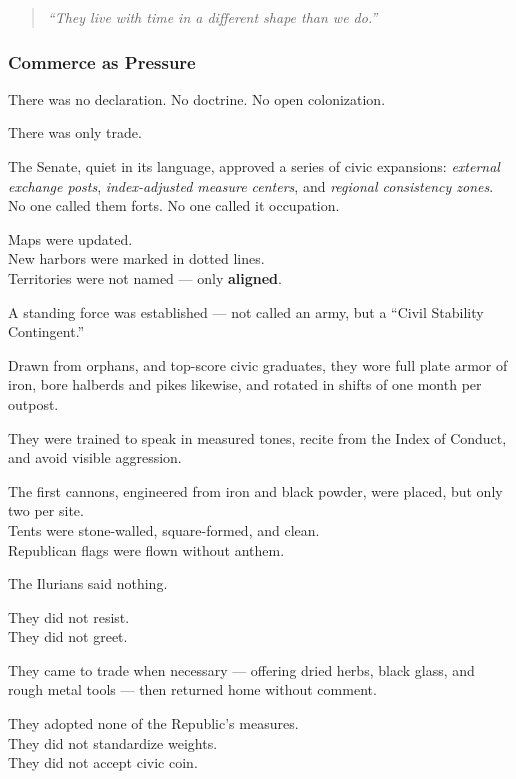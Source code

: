 \documentclass[12pt]{article}
\begin{document}
\begin{quote}
\textit{“They live with time in a different shape than we do.”}
\end{quote}

\dotfill

\subsubsection{Commerce as Pressure}

There was no declaration. No doctrine. No open colonization.

There was only trade.

The Senate, quiet in its language, approved a series of civic expansions: \textit{external exchange posts}, \textit{index-adjusted measure centers}, and \textit{regional consistency zones}. No one called them forts. No one called it occupation.

Maps were updated.\\
New harbors were marked in dotted lines.\\
Territories were not named — only \textbf{aligned}.

\vspace{1em}

A standing force was established — not called an army, but a ``Civil Stability Contingent.”

Drawn from orphans, and top-score civic graduates, they wore full plate armor of iron, bore halberds and pikes likewise, and rotated in shifts of one month per outpost.

They were trained to speak in measured tones, recite from the Index of Conduct, and avoid visible aggression.

The first cannons, engineered from iron and black powder, were placed, but only two per site.\\
Tents were stone-walled, square-formed, and clean.\\
Republican flags were flown without anthem.

\vspace{1em}

The Ilurians said nothing.

They did not resist.\\
They did not greet.

They came to trade when necessary — offering dried herbs, black glass, and rough metal tools — then returned home without comment.

They adopted none of the Republic’s measures.\\
They did not standardize weights.\\
They did not accept civic coin.
\end{document}
